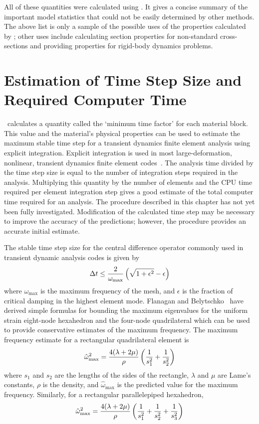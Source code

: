 All of these quantities were calculated using \NUM. It gives a concise
summary of the important model statistics that could not be easily
determined by other methods.  The above list is only a sample of the
possible uses of the properties calculated by \NUM; other uses include
calculating section properties for non-standard cross-sections and
providing properties for rigid-body dynamics problems. 

\chapter{Estimation of Time Step Size and Required Computer
Time}\label{s:time}

\NUM\ calculates a quantity called the `minimum time factor' for each
material block.  This value and the material's physical properties can
be used to estimate the maximum stable time step for a transient
dynamics finite element analysis using explicit integration. Explicit
integration is used in most large-deformation, nonlinear, transient
dynamics finite element codes~\cite{pronto,dyna}. The analysis time
divided by the time step size is equal to the number of integration
steps required in the analysis. Multiplying this quantity by the
number of elements and the CPU time required per element integration
step gives a good estimate of the total computer time required for an
analysis.  The procedure described in this chapter has not yet been
fully investigated.  Modification of the calculated time step may be
necessary to improve the accuracy of the predictions; however, the
procedure provides an accurate initial estimate.

The stable time step size for the central difference operator commonly
used in transient dynamic analysis codes is given by~\cite{cook} 
\begin{equation} 
\Delta t \leq {2\over \omega_{\max}} \left(\sqrt{1+\epsilon^2}-\epsilon\right)
\end{equation}
where $\omega_{\max}$ is the maximum frequency of the mesh, and
$\epsilon$
is the fraction of critical damping in the highest element mode.
Flanagan and Belytschko~\cite{flanagan} have derived simple formulas
for bounding the maximum eigenvalues for the uniform strain eight-node
hexahedron and the four-node quadrilateral which can be used to
provide conservative estimates of the maximum frequency.  The maximum
frequency estimate for a rectangular quadrilateral element is 
\begin{equation}
\hat\omega_{\max}^2 = {4(\lambda + 2\mu)\over\rho}\left({1\over s_1^2} +
   {1\over s_2^2}\right)
\end{equation}
where $s_1$ and $s_2$ are the lengths of the sides of the rectangle, 
$\lambda$ and $\mu$ are Lame's constants, $\rho$ is the density, and 
$\hat\omega_{\max}$ is the predicted value for the maximum frequency. 
Similarly, for a rectangular parallelepiped hexahedron, 
\begin{equation}
\hat\omega_{\max}^2 = {4(\lambda + 2\mu)\over\rho}\left({1\over s_1^2} +
   {1\over s_2^2}+{1\over s_3^2}\right)
\end{equation}

